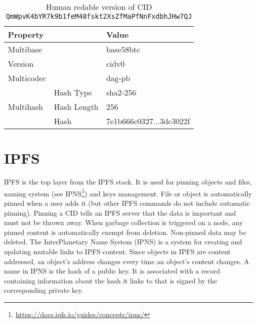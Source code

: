 \begin{table}[]
    \centering
    \begin{tabular}{|ll|l|}
    \hline
    \textbf{Property}                  &             & \textbf{Value}                                                            \\ \hline
    Multibase                                        &             & base58btc                                                        \\ \hline
    Version                                          &             & cidv0                                                            \\ \hline
    Multicodec                                       &             & dag-pb                                                           \\ \hline
    \multicolumn{1}{|l|}{\multirow{3}{*}{Multihash}} & Hash Type   & sha2-256                                                         \\ \cline{2-3} 
    \multicolumn{1}{|l|}{}                           & Hash Length & 256                                                              \\ \cline{2-3} 
    \multicolumn{1}{|l|}{}                           & Hash        & 7e1b666c0327...3dc3022f \\ \hline
    \end{tabular}
    \caption{Human redable version of CID \texttt{QmWpvK4bYR7k9b1feM48fskt2XsZfMaPfNnF\-xdbhJHw7QJ}}
    \label{tab:CIDexample}
\end{table}

\section{IPFS}
IPFS is the top layer from the IPFS stack. It is used for pinning objects and files, naming system (see IPNS\footnote{\url{https://docs.ipfs.io/guides/concepts/ipns/}}) and keys management. File or object is automatically pinned when a user adds it (but other IPFS commands do not include automatic pinning). Pinning a CID tells an IPFS server that the data is important and must not be thrown away. When garbage collection is triggered on a node, any pinned content is automatically exempt from deletion. Non-pinned data may be deleted. The InterPlanetary Name System (IPNS) is a system for creating and updating mutable links to IPFS content. Since objects in IPFS are content addressed, an object's address changes every time an object's content changes. A name in IPNS is the hash of a public key. It is associated with a record containing information about the hash it links to that is signed by the corresponding private key.




